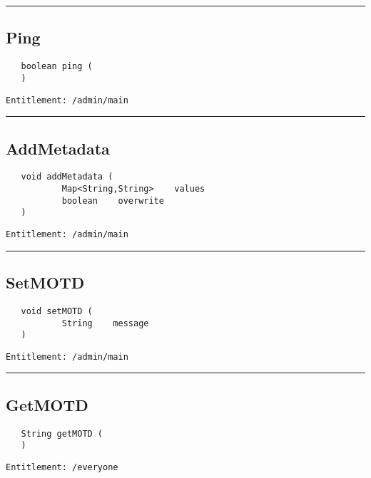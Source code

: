 \rule{12cm}{2pt}
\subsection{Ping}
\label{Api:Ping}
\begin{Verbatim}
   boolean ping (
   )
\end{Verbatim}
\begin{Verbatim}[formatcom=\color{Maroon}]
  Entitlement: /admin/main
\end{Verbatim}



\rule{12cm}{2pt}
\subsection{AddMetadata}
\label{Api:AddMetadata}
\begin{Verbatim}
   void addMetadata (
           Map<String,String>    values
           boolean    overwrite
   )
\end{Verbatim}
\begin{Verbatim}[formatcom=\color{Maroon}]
  Entitlement: /admin/main
\end{Verbatim}



\rule{12cm}{2pt}
\subsection{SetMOTD}
\label{Api:SetMOTD}
\begin{Verbatim}
   void setMOTD (
           String    message
   )
\end{Verbatim}
\begin{Verbatim}[formatcom=\color{Maroon}]
  Entitlement: /admin/main
\end{Verbatim}



\rule{12cm}{2pt}
\subsection{GetMOTD}
\label{Api:GetMOTD}
\begin{Verbatim}
   String getMOTD (
   )
\end{Verbatim}
\begin{Verbatim}[formatcom=\color{Maroon}]
  Entitlement: /everyone
\end{Verbatim}




